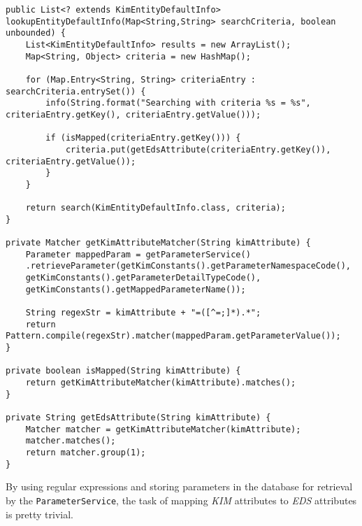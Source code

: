 \documentclass[12pt,notitlepage]{article}
\begin{document}
\begin{lstlisting}
public List<? extends KimEntityDefaultInfo> lookupEntityDefaultInfo(Map<String,String> searchCriteria, boolean unbounded) {
    List<KimEntityDefaultInfo> results = new ArrayList();
    Map<String, Object> criteria = new HashMap();
        
    for (Map.Entry<String, String> criteriaEntry : searchCriteria.entrySet()) {
        info(String.format("Searching with criteria %s = %s", criteriaEntry.getKey(), criteriaEntry.getValue()));
      
        if (isMapped(criteriaEntry.getKey())) {
            criteria.put(getEdsAttribute(criteriaEntry.getKey()), criteriaEntry.getValue());
        }
    }
        
    return search(KimEntityDefaultInfo.class, criteria);
}

private Matcher getKimAttributeMatcher(String kimAttribute) {
    Parameter mappedParam = getParameterService()
    .retrieveParameter(getKimConstants().getParameterNamespaceCode(),
    getKimConstants().getParameterDetailTypeCode(),
    getKimConstants().getMappedParameterName());

    String regexStr = kimAttribute + "=([^=;]*).*";
    return Pattern.compile(regexStr).matcher(mappedParam.getParameterValue());
}

private boolean isMapped(String kimAttribute) {
    return getKimAttributeMatcher(kimAttribute).matches();
}

private String getEdsAttribute(String kimAttribute) {
    Matcher matcher = getKimAttributeMatcher(kimAttribute);
    matcher.matches();
    return matcher.group(1);
}
\end{lstlisting}

By using regular expressions and storing parameters in the database for retrieval by the \verb|ParameterService|, the
task of mapping \emph{KIM} attributes to \emph{EDS} attributes is pretty trivial.
\end{document}
